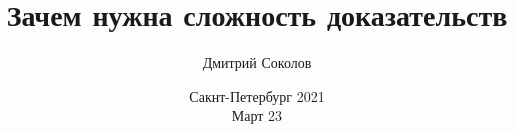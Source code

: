 

\titlegraphic{
    
}


\title[Сложность доказательств]{
    Зачем нужна сложность доказательств
}

\author[Соколов Д.]{
    Дмитрий Соколов
}  


\date{Сакнт-Петербург 2021\\ Март 23}





    \maketitle

    
    
    
    
    

